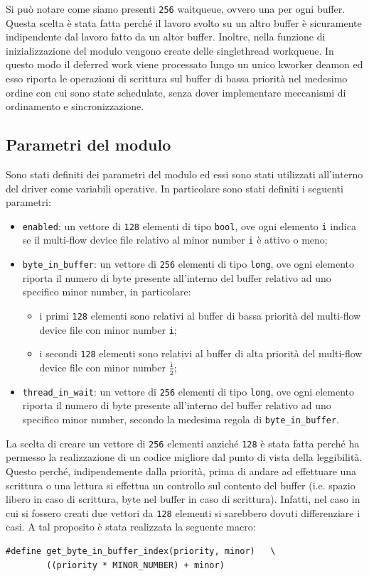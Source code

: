 \documentclass[oneside]{article}
\begin{document}
Si può notare come siamo presenti \texttt{256} waitqueue, ovvero una per ogni buffer. Questa scelta è stata fatta perché il lavoro svolto su un altro buffer è sicuramente indipendente dal lavoro fatto da un altor buffer. Inoltre, nella funzione di inizializzazione del modulo vengono create delle singlethread workqueue. In questo modo il deferred work viene processato lungo un unico kworker deamon ed esso riporta le operazioni di scrittura sul buffer di bassa priorità nel medesimo ordine con cui sono state schedulate, senza dover implementare meccanismi di ordinamento e sincronizzazione.

\subsection{Parametri del modulo}
Sono stati definiti dei parametri del modulo ed essi sono stati utilizzati all'interno del driver come variabili operative. In particolare sono stati definiti i seguenti parametri:
\begin{itemize}
\item \texttt{enabled}: un vettore di \texttt{128} elementi di tipo \texttt{bool}, ove ogni elemento \texttt{i} indica se il multi-flow device file relativo al minor number \texttt{i} è attivo o meno;
\item \texttt{byte\_in\_buffer}: un vettore di \texttt{256} elementi di tipo \texttt{long}, ove ogni elemento riporta il numero di byte presente all'interno del buffer relativo ad uno specifico minor number, in particolare:
\begin{itemize}
\item i primi \texttt{128} elementi sono relativi al buffer di bassa priorità del multi-flow device file con minor number \texttt{i};
\item i secondi \texttt{128} elementi sono relativi al buffer di alta priorità del multi-flow device file con minor number $\frac{\mathtt{i}}{\mathtt{2}}$;
\end{itemize}
\item \texttt{thread\_in\_wait}: un vettore di \texttt{256} elementi di tipo \texttt{long}, ove ogni elemento riporta il numero di byte presente all'interno del buffer relativo ad uno specifico minor number, secondo la medesima regola di \texttt{byte\_in\_buffer}.
\end{itemize}

La scelta di creare un vettore di \texttt{256} elementi anziché \texttt{128} è stata fatta perché ha permesso la realizzazione di un codice migliore dal punto di vista della leggibilità. Questo perché, indipendemente dalla priorità, prima di andare ad effettuare una scrittura o una lettura si effettua un controllo sul contento del buffer (i.e. spazio libero in caso di scrittura, byte nel buffer in caso di scrittura). Infatti, nel caso in cui si fossero creati due vettori da \texttt{128} elementi si sarebbero dovuti differenziare i casi. A tal proposito è stata realizzata la seguente macro:
\begin{lstlisting}
#define get_byte_in_buffer_index(priority, minor)	\
        ((priority * MINOR_NUMBER) + minor)
\end{lstlisting}
\end{document}
